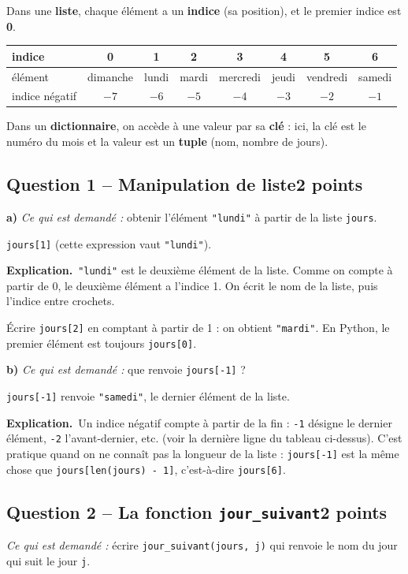 \documentclass[11pt, a4paper]{exam}
\newcommand{\code}[1]{\texttt{#1}}
\newcommand{\Qt}[2]{\subsection*{#1\hfill{\normalfont\small #2}}}
\newcommand{\rappel}[1]{\noindent\textit{Ce qui est demandé :} #1\par\smallskip}
\newcommand{\explication}{\noindent\textbf{Explication.}\ }
\begin{document}
\begin{retenir}
Dans une \textbf{liste}, chaque élément a un \textbf{indice} (sa position), et le premier indice est \textbf{0}.
\begin{center}\small
\begin{tabular}{|l|*{7}{c|}}\hline
indice & 0 & 1 & 2 & 3 & 4 & 5 & 6 \\\hline
élément & dimanche & lundi & mardi & mercredi & jeudi & vendredi & samedi \\\hline
indice négatif & $-7$ & $-6$ & $-5$ & $-4$ & $-3$ & $-2$ & $-1$ \\\hline
\end{tabular}
\end{center}
Dans un \textbf{dictionnaire}, on accède à une valeur par sa \textbf{clé} : ici, la clé est le numéro du mois et la valeur est un \textbf{tuple} (nom, nombre de jours).
\end{retenir}

\Qt{Question 1 -- Manipulation de liste}{2 points}

\textbf{a)} \rappel{obtenir l'élément \code{"lundi"} à partir de la liste \code{jours}.}
\begin{reponse}
\code{jours[1]} (cette expression vaut \code{"lundi"}).
\end{reponse}
\explication \code{"lundi"} est le deuxième élément de la liste. Comme on compte à partir de 0, le deuxième élément a l'indice 1. On écrit le nom de la liste, puis l'indice entre crochets.

\begin{erreur}
Écrire \code{jours[2]} en comptant à partir de 1 : on obtient \code{"mardi"}. En Python, le premier élément est toujours \code{jours[0]}.
\end{erreur}

\textbf{b)} \rappel{que renvoie \code{jours[-1]} ?}
\begin{reponse}
\code{jours[-1]} renvoie \code{"samedi"}, le dernier élément de la liste.
\end{reponse}
\explication Un indice négatif compte à partir de la fin : \code{-1} désigne le dernier élément, \code{-2} l'avant-dernier, etc. (voir la dernière ligne du tableau ci-dessus). C'est pratique quand on ne connaît pas la longueur de la liste : \code{jours[-1]} est la même chose que \mbox{\code{jours[len(jours) - 1]}}, c'est-à-dire \code{jours[6]}.

\Qt{Question 2 -- La fonction \code{jour\_suivant}}{2 points}
\rappel{écrire \code{jour\_suivant(jours, j)} qui renvoie le nom du jour qui suit le jour \code{j}.}
\end{document}
